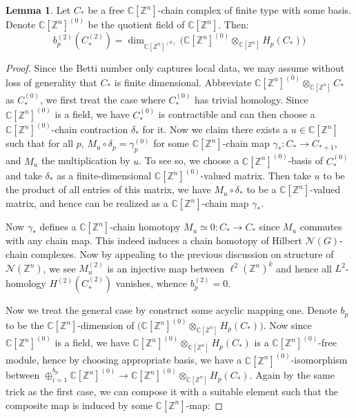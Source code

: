 \documentclass[11pt]{report}
\theoremstyle{definition}
\newtheorem{Lemma}[Def]{Lemma}
\theoremstyle{plain}
\newcommand{\complex}{\mathbb{C}}
\newcommand{\integer}{\mathbb{Z}}
\newcommand{\vna}{\mathcal{N}}
\begin{document}
\begin{Lemma}\label{1.34}
	Let $C_*$ be a free $\complex[\integer^n]$-chain complex of finite type with some basis. Denote $\complex[\integer^n]^{(0)}$ be the quotient field of $\complex [\integer^n]$. Then:
	\begin{equation}
	b_p^{(2)}(C_*^{(2)})=\dim_{\complex[\integer^n]^{(0)}}\Big(\complex[\integer^n]^{(0)}\otimes_{\complex[\integer^n]}H_p(C_*)\Big)
	\end{equation}
\end{Lemma}
\begin{proof}
	Since the Betti number only captures local data, we may assume without loss of generality that $C_*$ is finite dimensional. Abbreviate $\complex[\integer^n]^{(0)}\otimes_{\complex[\integer^n]}C_*$ as $C_*^{(0)}$, we first treat the case where $C_*^{(0)}$ has trivial homology. Since $\complex[\integer^n]^{(0)}$ is a field, we have $C_*^{(0)}$ is contractible and can then choose a $\complex[\integer^n]^{(0)}$-chain contraction $\delta_*$ for it. Now we claim there exists a $u\in \complex[\integer^n]$ such that for all $p$, $M_u\circ \delta_p=\gamma_p^{(0)}$ for some $\complex[\integer^n]$-chain map $\gamma_*:C_*\to C_{*+1}$, and $M_u$ the multiplication by $u$. To see so, we choose a $\complex[\integer^n]^{(0)}$-basis of $C^{(0)}_*$ and take $\delta_*$ as a finite-dimensional $\complex[\integer^n]^{(0)}$-valued matrix. Then take $u$ to be the product of all entries of this matrix, we have $M_u\circ \delta_*$ to be a $\complex[\integer^n]$-valued matrix, and hence can be realized as a $\complex[\integer^n]$-chain map $\gamma_*$.
\par Now $\gamma_*$ defines a $\complex[\integer^n]$-chain homotopy $M_u\simeq 0:C_*\to C_*$ since $M_u$ commutes with any chain map. This indeed induces a chain homotopy of Hilbert $\vna(G)$-chain complexes. Now by appealing to the previous discussion on structure of $\vna(\integer^n)$, we see $M_u^{(2)}$ is an injective map between $\ell^2(\integer^n)^k$ and hence all $L^2$-homology $H^{(2)}(C^{(2)}_*)$ vanishes, whence $b_p^{(2)}=0$.
\par Now we treat the general case by construct some acyclic mapping one. Denote $b_p$ to be the $\complex[\integer^n]$-dimension of  $\Big(\complex[\integer^n]^{(0)}\otimes_{\complex[\integer^n]}H_p(C_*)\Big)$.  Now since $\complex[\integer^n]^{(0)}$ is a field, we have $\complex[\integer^n]^{(0)}\otimes_{\complex[\integer^n]}H_p(C_*)$ is a $\complex[\integer^n]^{(0)}$-free module, hence by choosing appropriate basis, we have a $\complex[\integer^n]^{(0)}$-isomorphism between $\oplus^{b_p}_{i=1} \complex[\integer^n]^{(0)}\to \complex[\integer^n]^{(0)}\otimes_{\complex[\integer^n]}H_p(C_*)$. Again by the same trick as the first case, we can compose it with a suitable element such that the composite map is induced by some $\complex[\integer^n]$-map:

\end{proof}
\end{document}
